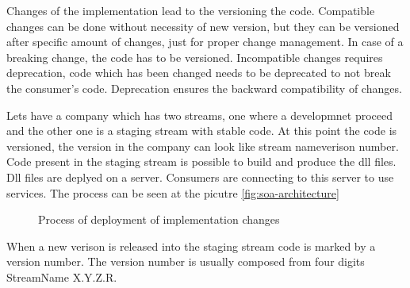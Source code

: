 Changes of the implementation lead to the versioning the code. Compatible changes can be done without necessity of new version, but they can be versioned after specific amount of changes, just for proper change management. In case of a breaking change, the code has to be versioned. Incompatible changes requires deprecation, code which has been changed needs to be deprecated to not break the consumer's code. Deprecation ensures the backward compatibility of changes.

Lets have a company which has two streams, one where a developmnet proceed and the other one is a staging stream with stable code. At this point the code is versioned, the version in the company can look like {stream name}{verison number}. Code present in the staging stream is possible to build and produce the dll files. Dll files are deplyed on a server. Consumers are connecting to this server to use services. The process can be seen at the picutre \ref{fig:soa-architecture}

\begin{figure}[htp] 
\caption{Process of deployment of implementation changes}
\label{fig:service-implementation}
\end{figure} 

When a new verison is released into the staging stream code is marked by a version number. The version number is usually composed from four digits {StreamName} X.Y.Z.R.

